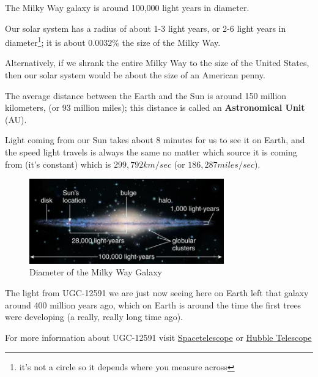 \documentclass[10pt,letterpaper]{article}
\begin{document}
The Milky Way galaxy is around 100,000 light years in diameter.


Our solar system has a radius of about 1-3 light years, or 2-6 light years in diameter\footnote{it's not a circle so it depends where you measure across}; it is about $0.0032\%$ the size of the Milky Way.

Alternatively, if we shrank the entire Milky Way to the size of the United States, then our solar system would be about the size of an American penny. 

The average distance between the Earth and the Sun is around 150 million kilometers, (or 93 million miles); this distance is called an \textbf{Astronomical Unit} (AU). 

Light coming from our Sun takes about 8 minutes for us to see it on Earth, and the speed light travels is always the same no matter which source it is coming from (it's constant) which is $299,792 km/sec$ (or $186,287 miles/sec$). 

\begin{figure}[!ht]
\begin{framed}
\begin{center}
\includegraphics[width=0.75\textwidth]{../Images/diameter-milkyway.jpg} 
\caption{Diameter of the Milky Way Galaxy}
\end{center}
\end{framed}
\end{figure}

The light from UGC-12591 we are just now seeing here on Earth left that galaxy around 400 million years ago, which on Earth is around the time the first trees were developing (a really, really long time ago).

For more information about UGC-12591 visit \href{https://www.spacetelescope.org/images/potw1709a/}{Spacetelescope}
or
\href{http://www.space.com/35955-massive-hybrid-galaxy-hubble-telescope-photo.html}{Hubble Telescope}

\pagebreak
\end{document}
